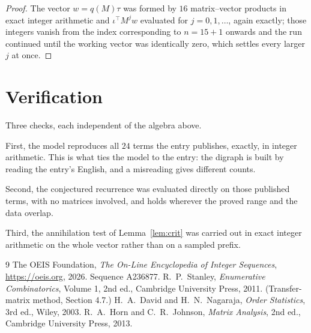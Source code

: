 \documentclass[11pt,a4paper]{article}
\theoremstyle{plain}
\theoremstyle{definition}
\begin{document}
\begin{proof}
The vector $w=q(M)\tau$ was formed by $16$ matrix--vector products in exact integer
arithmetic and $\iota^{\!\top}M^{j}w$ evaluated for $j=0,1,\dots$, again exactly; those
integers vanish from the index corresponding to $n=15+1$ onwards and the run continued
until the working vector was identically zero, which settles every larger $j$ at once.
\end{proof}

\section{Verification}

Three checks, each independent of the algebra above.

First, the model reproduces all $24$ terms the entry publishes, exactly, in integer
arithmetic. This is what ties the model to the entry: the digraph is built by reading the
entry's English, and a misreading gives different counts.

Second, the conjectured recurrence was evaluated directly on those published terms, with no
matrices involved, and holds wherever the proved range and the data overlap.

Third, the annihilation test of Lemma~\ref{lem:crit} was carried out in exact integer
arithmetic on the whole vector rather than on a sampled prefix.

\begin{thebibliography}{9}
 The OEIS Foundation, \emph{The On-Line Encyclopedia of Integer
Sequences}, \url{https://oeis.org}, 2026. Sequence A236877.
 R.~P.~Stanley, \emph{Enumerative Combinatorics}, Volume 1, 2nd ed.,
Cambridge University Press, 2011. (Transfer-matrix method, Section 4.7.)
 H.~A.~David and H.~N.~Nagaraja, \emph{Order Statistics}, 3rd ed., Wiley,
2003.
 R.~A.~Horn and C.~R.~Johnson, \emph{Matrix Analysis}, 2nd ed., Cambridge
University Press, 2013.
\end{thebibliography}
\end{document}

